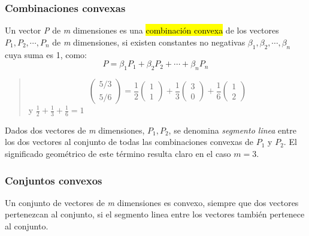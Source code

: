 \subsubsection{Combinaciones convexas}

Un vector \textit{P} de \textit{m} dimensiones es una \hl{combinación convexa} de los vectores \(P_1, P_2, \cdots, P_n\) de \textit{m} dimensiones, si existen constantes no negativas \(\beta_1, \beta_2, \cdots, \beta_n\) cuya suma es 1, como:
\begin{equation}
  P = \beta_1 P_1 + \beta_2 P_2 + \cdots + \beta_n P_n
  \label{eq:def_convexo}
\end{equation}

\begin{quote}
  \[
    \begin{pmatrix}
      5/3 \\ 5/6
    \end{pmatrix} = \frac{1}{2}\begin{pmatrix}
      1 \\ 1
    \end{pmatrix} + \frac{1}{3} \begin{pmatrix}
      3 \\ 0
    \end{pmatrix} + \frac{1}{6}\begin{pmatrix}
      1 \\ 2
    \end{pmatrix}
  \]
  y \(\frac{1}{2}+\frac{1}{3}+\frac{1}{6} = 1\)
\end{quote}

Dados dos vectores de \textit{m} dimensiones, \(P_1, P_2\), se denomina \textit{segmento linea} entre los dos vectores al conjunto de todas las combinaciones convexas de \(P_1\) y \(P_2\). El significado geométrico de este término resulta claro en el caso \(m=3\).

\subsubsection{Conjuntos convexos}

Un conjunto de vectores de \textit{m} dimensiones es convexo, siempre que dos vectores pertenezcan al conjunto, si el segmento linea entre los vectores también pertenece al conjunto.

\begin{quote}
\end{quote}